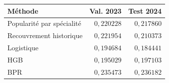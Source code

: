 \begin{tabularx}{\linewidth}{@{}Xrr@{}}
\toprule
Méthode & Val. 2023 & Test 2024 \\
\midrule
Popularité par spécialité & $0{,}220228$ & $0{,}217860$ \\
Recouvrement historique & $0{,}221954$ & $0{,}210373$ \\
Logistique & $0{,}194684$ & $0{,}184441$ \\
HGB & $0{,}195029$ & $0{,}197103$ \\
BPR & $0{,}235473$ & $0{,}236182$ \\
\bottomrule
\end{tabularx}
